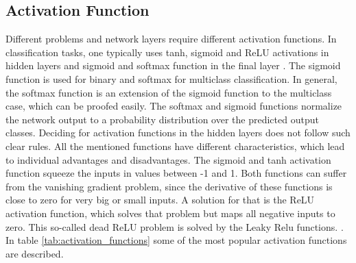 \subsection{Activation Function}
Different problems and network layers require different activation functions. In classification tasks, one typically uses tanh, sigmoid and ReLU activations in hidden layers and sigmoid and softmax function in the final layer \cite{Ding2018}. The sigmoid function is used for binary and softmax for multiclass classification. In general, the softmax function is an extension of the sigmoid function to the multiclass case, which can be proofed easily. The softmax and sigmoid functions normalize the network output to a probability distribution over the predicted output classes. Deciding for activation functions in the hidden layers does not follow such clear rules. All the mentioned functions have different characteristics, which lead to individual advantages and disadvantages. The sigmoid and tanh activation function squeeze the inputs in values between -1 and 1. Both functions can suffer from the vanishing gradient problem, since the derivative of these functions is close to zero for very big or small inputs. A solution for that is the ReLU activation function, which solves that problem but maps all negative inputs to zero. This so-called dead ReLU problem is solved by the Leaky Relu functions.  \cite{Ding2018}. In table \ref{tab:activation_functions} some of the most popular activation functions are described.


